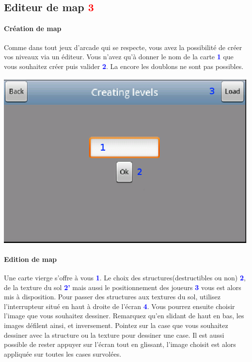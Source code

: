 	
\subsection{Editeur de map \textcolor{red}{3} }
	
	\paragraph{Création de map\\}
	Comme dans tout jeux d'arcade qui se respecte, vous avez la possibilité de
	créer vos niveaux via un éditeur. Vous n'avez qu'à donner le nom de la carte
	\textcolor{blue}{\textbf{1}} que vous souhaitez créer puis valider
	\textcolor{blue}{\textbf{2}}. La encore les doublons ne sont pas possibles.
	
	\begin{center}
			\includegraphics[scale=0.9]{Manuel/Img/10.eps}
	\end{center}

	
	\paragraph{Edition de map\\}
	Une carte vierge s'offre à vous \textcolor{blue}{\textbf{1}}. Le choix des
	structures(destructibles ou non) \textcolor{blue}{\textbf{2}}, de la texture du
	sol \textcolor{blue}{\textbf{2'}} mais aussi le positionnement des joueurs
	\textcolor{blue}{\textbf{3}} vous est alors mis à disposition. Pour passer des
	structures aux textures du sol, utilisez l'interrupteur situé en haut à droite
	de l'écran \textcolor{blue}{\textbf{4}}. Vous pourrez ensuite choisir l'image
	que vous souhaitez dessiner. Remarquez qu'en slidant de haut en bas, les images
	défilent ainsi, et inversement. Pointez sur la case que vous souhaitez dessiner
	avec la structure ou la texture pour dessiner une case. Il est aussi possible de rester appuyer sur l'écran tout en
	glissant, l'image choisit est alors appliquée sur toutes les cases survolées.
	
